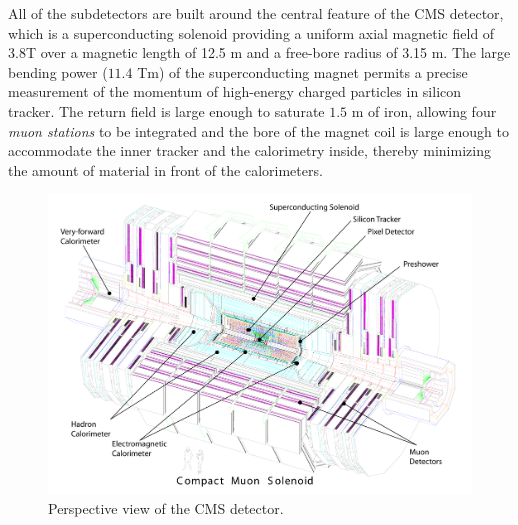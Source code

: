 All of the subdetectors are built around the central feature of the
CMS detector, which is a superconducting solenoid providing a uniform axial
magnetic field of 3.8\unit{T}  over a magnetic length of 12.5 \unit{m}
and a free-bore radius of 3.15 \unit{m}. The large bending power ($11.4$ \unit{T}\unit{m}) of the
superconducting magnet permits a precise measurement of the momentum
of high-energy charged particles in silicon tracker. The return field is large enough to
saturate $1.5$ \unit{m} of iron, allowing four \emph{muon stations} to be
integrated and the bore of the magnet coil is large enough to accommodate the inner tracker
and the calorimetry inside, thereby minimizing the amount of material
in front of the calorimeters.


\begin{figure}\centering
\includegraphics[width=.9\textwidth]{figs/cms/Figure_001-002.pdf}
\caption{Perspective view of the CMS detector.\label{fig:CMSperspective}}
\end{figure}

